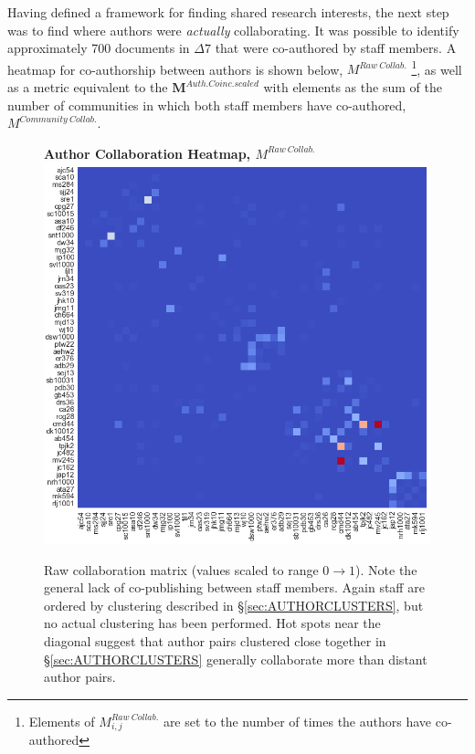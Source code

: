 Having defined a framework for finding shared research interests, the next step was to find where authors were \emph{actually} collaborating. It was possible to identify approximately 700 documents in $\Delta7$ that were co-authored by staff members. A heatmap for co-authorship between authors is shown below, $M^{Raw\ Collab.}$ \footnote{Elements of $M^{Raw\ Collab.}_{i , j}$ are set to the number of times the authors have co-authored}, as well as a metric equivalent to the $\mathbf{M}^{Auth. Coinc.scaled}$ with elements as the sum of the number of communities in which both staff members have co-authored, $M^{Community\ Collab.}$.
\begin{figure}[H]
  \centering
  \textbf{Author Collaboration Heatmap, $M^{Raw\ Collab.}$}
    \includegraphics[width=\textwidth]{Analysis/raw_collabs.png}
    \caption[Author Collaboration Heatmap]{Raw collaboration matrix (values scaled to range $0 \rightarrow 1$). Note the general lack of co-publishing between staff members. Again staff are ordered by clustering described in \S\ref{sec:AUTHORCLUSTERS}, but no actual clustering has been performed. Hot spots near the diagonal suggest that author pairs clustered close together in \S\ref{sec:AUTHORCLUSTERS} generally collaborate more than distant author pairs.}
      \label{fig:rawcollabs}
  \end{figure}
